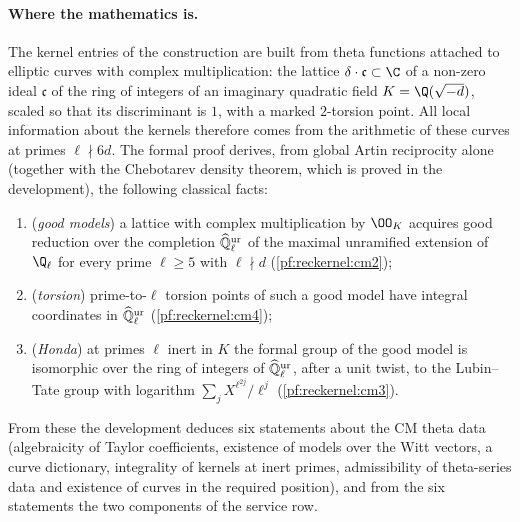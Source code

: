 \paragraph{Where the mathematics is.}
The kernel entries of the construction are built from theta functions attached to elliptic curves with complex
multiplication: the lattice $\delta\cdot\mathfrak c\subset\C$ of a non-zero ideal $\mathfrak c$ of the ring of
integers of an imaginary quadratic field $K=\Q(\sqrt{-d})$, scaled so that its discriminant is $1$, with a
marked $2$-torsion point. All local information about the kernels therefore comes from the arithmetic of these
curves at primes $\ell\nmid 6d$. The formal proof derives, from global Artin reciprocity alone (together with
the Chebotarev density theorem, which is proved in the development), the following classical facts:
\begin{enumerate}[label=(\roman*)]
\item (\emph{good models}) a lattice with complex multiplication by $\OO_K$ acquires good reduction over the
  completion $\widehat{\mathbb{Q}}{}_\ell^{\mathrm{ur}}$ of the maximal unramified extension of $\Q_\ell$ for every prime $\ell\ge5$ with
  $\ell\nmid d$ (\cref{pf:reckernel:cm2});
\item (\emph{torsion}) prime-to-$\ell$ torsion points of such a good model have integral coordinates in
  $\widehat{\mathbb{Q}}{}_\ell^{\mathrm{ur}}$ (\cref{pf:reckernel:cm4});
\item (\emph{Honda}) at primes $\ell$ inert in $K$ the formal group of the good model is isomorphic over the
  ring of integers of $\widehat{\mathbb{Q}}{}_\ell^{\mathrm{ur}}$, after a unit twist, to the Lubin--Tate group with logarithm
  $\sum_j X^{\ell^{2j}}/\ell^j$ (\cref{pf:reckernel:cm3}).
\end{enumerate}
From these the development deduces six statements about the CM theta data (algebraicity of Taylor coefficients,
existence of models over the Witt vectors, a curve dictionary, integrality of kernels at inert primes,
admissibility of theta-series data and existence of curves in the required position), and from the six
statements the two components of the service row.

